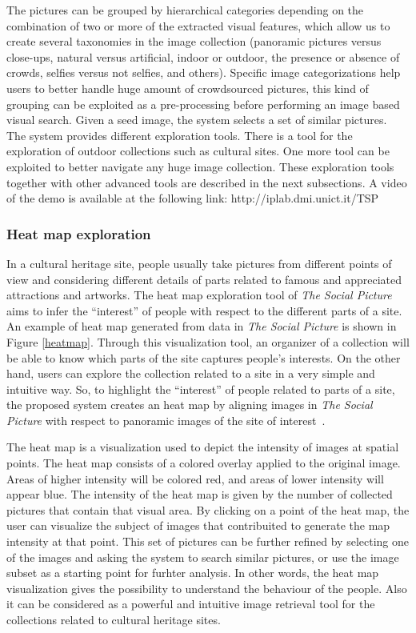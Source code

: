 The pictures can be grouped by hierarchical categories depending on the combination of two or more of the extracted visual features, which allow us to create several taxonomies in the image collection (panoramic pictures versus close-ups, natural versus artificial, indoor or outdoor, the presence or absence of crowds, selfies versus not selfies, and others).
Specific image categorizations help users to better handle huge amount of crowdsourced pictures, this kind of grouping can be exploited as a pre-processing before performing an image based visual search. Given a seed image, the system selects a set of similar pictures.
The system provides different exploration tools. There is a tool for the exploration of outdoor collections such as cultural sites. %
One more tool can be exploited to better navigate any huge image collection. These exploration tools together with other advanced tools are described in the next subsections.
A video of the demo is available at the following link:
http://iplab.dmi.unict.it/TSP

\subsubsection{Heat map exploration}
In a cultural heritage site, people usually take pictures from different points of view and considering different details of parts related to famous and appreciated attractions and artworks. The heat map exploration tool of \textit{The Social Picture} aims to infer the ``interest'' of people with respect to the different parts of a site. An example of heat map generated from data in \textit{The Social Picture} is shown in Figure \ref{heatmap}. Through this visualization tool, an organizer of a collection will be able to know which parts of the site captures people's interests.
On the other hand, users can explore the collection related to a site in a very simple and intuitive way. So, to highlight the ``interest'' of people related to parts of a site, the proposed system creates an heat map by aligning images in \textit{The Social Picture} with respect to panoramic images of the site of interest~\cite{Mikulík2015}.

The heat map is a visualization used to depict the intensity of images at spatial points. The heat map consists of a colored overlay applied to the original image. Areas of higher intensity will be colored red, and areas of lower intensity will appear blue. The intensity of the heat map is given by the number of collected pictures that contain that visual area.
By clicking on a point of the heat map, the user can visualize the subject of images that contribuited to generate the map intensity at that point. This set of pictures can be further refined by selecting one of the images and asking the system to search similar pictures, or use the image subset as a starting point for furhter analysis. In other words, the heat map visualization gives the possibility to understand the behaviour of the people. Also it can be considered as a powerful and intuitive image retrieval tool for the collections related to cultural heritage sites.

